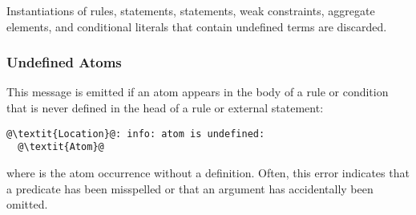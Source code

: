 \begin{note}
Instantiations of rules,  statements,  statements, weak constraints, aggregate elements, and conditional literals
that contain undefined terms are discarded.
\end{note}

\subsubsection{Undefined Atoms}\label{sec:warn:undefatm}
This message is emitted if an atom appears in the body of a rule or condition
that is never defined in the head of a rule or external statement:
\begin{lstlisting}[numbers=none,escapechar=@]
@\textit{Location}@: info: atom is undefined:
  @\textit{Atom}@
\end{lstlisting}
%
where  is the atom occurrence without a definition.
Often, this error indicates that a predicate has been misspelled 
or that an argument has accidentally been omitted.

